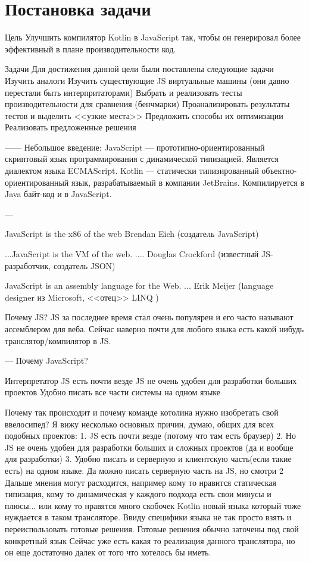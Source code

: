 \chapter{Постановка задачи}

Цель
Улучшить компилятор Kotlin в JavaScript так, чтобы он генерировал более эффективный в плане производительности код.


Задачи
Для достижения данной цели были поставлены следующие задачи
Изучить аналоги
Изучить существующие JS виртуальные машины (они давно перестали быть интерпритаторами)
Выбрать и реализовать тесты производительности для сравнения (бенчмарки)
Проанализировать результаты тестов и выделить <<узкие места>>
Предложить способы их оптимизации
Реализовать предложенные решения

------
Небольшое введение:
JavaScript — прототипно-ориентированный скриптовый язык программирования с динамической типизацией. Является диалектом языка ECMAScript.
Kotlin — статически типизированный объектно-ориентированный язык, разрабатываемый в компании JetBrains. Компилируется в Java байт-код и в JavaScript.

---

JavaScript is the x86 of the web
Brendan Eich (создатель JavaScript)

...JavaScript is the VM of the web. ....
Douglas Crockford (известный JS-разработчик, создатель JSON)

JavaScript is an assembly language for the Web. ...
Erik Meijer (language designer из Microsoft,
<<отец>> LINQ )

Почему JS? JS за последнее время стал очень популярен и его часто называют ассемблером для веба. Сейчас наверно почти для любого языка есть какой нибудь транслятор/компилятор в JS. 

---
Почему JavaScript?

Интерпретатор JS есть почти везде
JS не очень удобен для разработки больших проектов
Удобно писать все части системы на одном языке



Почему так происходит и почему команде котолина нужно изобретать свой ввелосипед? Я вижу несколько основных причин, думаю, общих для всех подобных проектов:
1. JS есть почти везде (потому что там есть браузер)
2. Но JS не очень удобен для разработки больших и сложных проектов (да и вообще для разработки)
3. Удобно писать и серверную и клиентскую часть(если такие есть) на одном языке. Да можно писать серверную часть на JS, но смотри 2
Дальше мнения могут расходится, например кому то нравится статическая типизация, кому то динамическая у каждого подхода есть свои минусы и плюсы...
или кому то нравятся много скобочек
Kotlin новый языка который тоже нуждается в таком трансляторе.
Ввиду специфики языка не так просто взять и переиспользовать готовые решения. Готовые решения обычно заточены под свой конкретный язык
Сейчас уже есть какая то реализация данного транслятора, но он еще достаточно далек от того что хотелось бы иметь.


